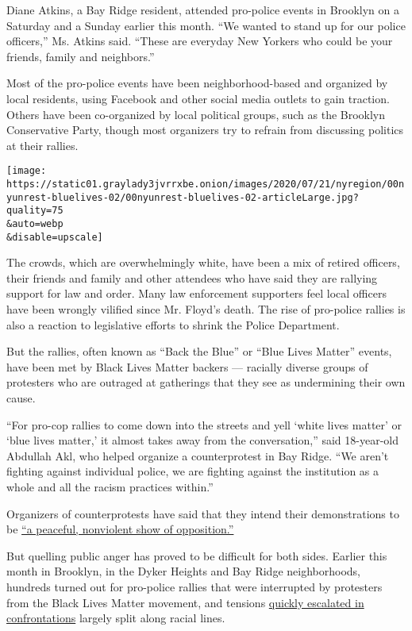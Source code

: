 Diane Atkins, a Bay Ridge resident, attended pro-police events in
Brooklyn on a Saturday and a Sunday earlier this month. ``We wanted to
stand up for our police officers,'' Ms. Atkins said. ``These are
everyday New Yorkers who could be your friends, family and neighbors.''

Most of the pro-police events have been neighborhood-based and organized
by local residents, using Facebook and other social media outlets to
gain traction. Others have been co-organized by local political groups,
such as the Brooklyn Conservative Party, though most organizers try to
refrain from discussing politics at their rallies.

\texttt{[image: https://static01.graylady3jvrrxbe.onion/images/2020/07/21/nyregion/00nyunrest-bluelives-02/00nyunrest-bluelives-02-articleLarge.jpg?quality=75\\\&auto=webp\\\&disable=upscale]}

The crowds, which are overwhelmingly white, have been a mix of retired
officers, their friends and family and other attendees who have said
they are rallying support for law and order. Many law enforcement
supporters feel local officers have been wrongly vilified since Mr.
Floyd's death. The rise of pro-police rallies is also a reaction to
legislative efforts to shrink the Police Department.

But the rallies, often known as ``Back the Blue'' or ``Blue Lives
Matter'' events, have been met by Black Lives Matter backers ---
racially diverse groups of protesters who are outraged at gatherings
that they see as undermining their own cause.

``For pro-cop rallies to come down into the streets and yell `white
lives matter' or `blue lives matter,' it almost takes away from the
conversation,'' said 18-year-old Abdullah Akl, who helped organize a
counterprotest in Bay Ridge. ``We aren't fighting against individual
police, we are fighting against the institution as a whole and all the
racism practices within.''

Organizers of counterprotests have said that they intend their
demonstrations to be
\href{https://docs.google.com/document/u/1/d/10I6F6sJfQB5NtZecobxN6mZ2Ua1eT0qe5PvZzGL0WrI/mobilebasic}{``a
peaceful, nonviolent show of opposition.''}

But quelling public anger has proved to be difficult for both sides.
Earlier this month in Brooklyn, in the Dyker Heights and Bay Ridge
neighborhoods, hundreds turned out for pro-police rallies that were
interrupted by protesters from the Black Lives Matter movement, and
tensions
\href{https://nypost.com/2020/07/11/blue-and-black-lives-matter-protesters-clash-in-nyc/}{quickly
escalated in confrontations} largely split along racial lines.

